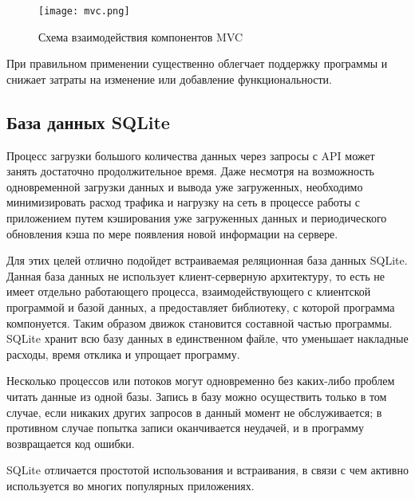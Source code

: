 \begin{figure}[h!]
\centering
\texttt{[image: mvc.png]}
\caption{Схема взаимодействия компонентов MVC}
\label{fig:mvc}
\end{figure}

При правильном применении \mvc{} существенно облегчает поддержку программы и
снижает затраты на изменение или добавление функциональности.

\subsection{База данных SQLite}
\label{sec:sqlite}
Процесс загрузки большого количества данных через запросы с API может занять
достаточно продолжительное время. Даже несмотря на возможность одновременной
загрузки данных и вывода уже загруженных, необходимо минимизировать расход
трафика и нагрузку на сеть в процессе работы с приложением путем кэширования
уже загруженных данных и периодического обновления кэша по мере появления новой
информации на сервере.

Для этих целей отлично подойдет встраиваемая реляционная база данных SQLite.
Данная база данных не использует клиент-серверную архитектуру, то есть не имеет
отдельно работающего процесса, взаимодействующего с клиентской программой и
базой данных, а предоставляет библиотеку, с которой программа компонуется. Таким
образом движок становится составной частью программы. SQLite хранит всю базу
данных в единственном файле, что уменьшает накладные расходы, время отклика и упрощает
программу.

Несколько процессов или потоков могут одновременно без каких-либо проблем читать
данные из одной базы. Запись в базу можно осуществить только в том случае, если
никаких других запросов в данный момент не обслуживается; в противном случае
попытка записи оканчивается неудачей, и в программу возвращается код ошибки.

SQLite отличается простотой использования и встраивания, в связи с чем активно
используется во многих популярных приложениях.




